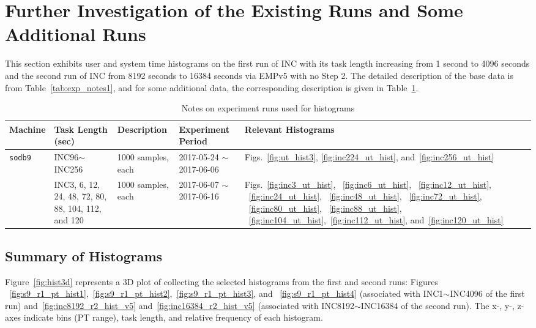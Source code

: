 \section{Further Investigation of the Existing Runs and Some Additional Runs~\label{sec:u_s_time_hist}} 
This section exhibits user and system time histograms on the first run of 
INC with its task length increasing from 1 second to 4096 seconds 
and the second run of INC from 8192 seconds to 16384 seconds via EMPv5 with no Step 2.
The detailed description of the base data is from Table~\ref{tab:exp_notes1}, 
and for some additional data, the corresponding description is given in Table~\ref{tab:exp_notes4}.

\begin{table}[h]
\begin{center}
\begin{tabular}{|p{2cm}|p{3cm}|p{3cm}|p{4cm}|p{3.5cm}|} \hline
Machine & Task Length (sec) & Description & Experiment Period & Relevant \linebreak Histograms\\ \hline
{\tt sodb9} &  INC96$\sim$INC256 & 1000 samples, each & 2017-05-24 $\sim$ 2017-06-06 & 
Figs.~\ref{fig:ut_hist3}, \ref{fig:inc224_ut_hist}, and~\ref{fig:inc256_ut_hist}\\ \hline
					&  INC3, 6, 12, 24, 48, 72, 80, 88, 104, 112, and 120 & 1000 samples, each & 2017-06-07 $\sim$ 2017-06-16 & Figs.~\ref{fig:inc3_ut_hist}, ~\ref{fig:inc6_ut_hist}, ~\ref{fig:inc12_ut_hist}, ~\ref{fig:inc24_ut_hist},
~\ref{fig:inc48_ut_hist}, ~\ref{fig:inc72_ut_hist}, ~\ref{fig:inc80_ut_hist}, ~\ref{fig:inc88_ut_hist}, ~\ref{fig:inc104_ut_hist},~\ref{fig:inc112_ut_hist}, and~\ref{fig:inc120_ut_hist}\\ \hline
\end{tabular}
\end{center}
\vspace{-.2in}
\caption{Notes on experiment runs used for histograms\label{tab:exp_notes4}}
\end{table}

\subsection{Summary of Histograms}
Figure~\ref{fig:hist3d} represents a 3D plot of collecting 
the selected histograms from the first and second runs: 
Figures ~\ref{fig:s9_r1_pt_hist1},~\ref{fig:s9_r1_pt_hist2},~\ref{fig:s9_r1_pt_hist3}, and ~\ref{fig:s9_r1_pt_hist4} (associated with INC1$\sim$INC4096 of the first run) and~\ref{fig:inc8192_r2_hist_v5} and~\ref{fig:inc16384_r2_hist_v5} (associated with  INC8192$\sim$INC16384 of the second run). The x-, y-, z-axes 
indicate bins (PT range), task length, 
and relative frequency of each histogram.

